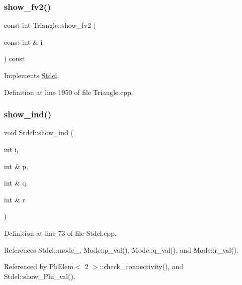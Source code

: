 \subsubsection{\texorpdfstring{show\+\_\+fv2()}{show\_fv2()}}
{\footnotesize\ttfamily const int Triangle\+::show\+\_\+fv2 (\begin{DoxyParamCaption}\item[{const int \&}]{i }\end{DoxyParamCaption}) const\hspace{0.3cm}{\ttfamily [virtual]}}



Implements \hyperlink{classStdel_a67f16a65f02fc8a5aa10274539bd1ad8}{Stdel}.



Definition at line 1950 of file Triangle.\+cpp.

\mbox{\label{classStdel_a20afd536025caf1aad1c4e3f41fcb866}} 
\subsubsection{\texorpdfstring{show\+\_\+ind()}{show\_ind()}}
{\footnotesize\ttfamily void Stdel\+::show\+\_\+ind (\begin{DoxyParamCaption}\item[{int}]{i,  }\item[{int \&}]{p,  }\item[{int \&}]{q,  }\item[{int \&}]{r }\end{DoxyParamCaption})\hspace{0.3cm}{\ttfamily [inherited]}}



Definition at line 73 of file Stdel.\+cpp.



References Stdel\+::mode\+\_\+, Mode\+::p\+\_\+val(), Mode\+::q\+\_\+val(), and Mode\+::r\+\_\+val().



Referenced by Ph\+Elem$<$ 2 $>$\+::check\+\_\+connectivity(), and Stdel\+::show\+\_\+\+Phi\+\_\+val().

